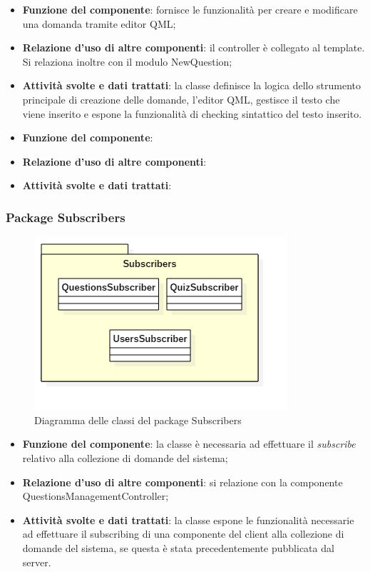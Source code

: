 \begin{itemize}
	\item\textbf{Funzione del componente}: fornisce le funzionalità per creare e modificare una domanda tramite editor QML;
	\item\textbf{Relazione d'uso di altre componenti}: il controller è collegato al template. Si relaziona inoltre con il modulo NewQuestion;
	\item\textbf{Attività svolte e dati trattati}: la classe definisce la logica dello strumento principale di creazione delle domande, l'editor QML, gestisce il testo che viene inserito e espone la funzionalità di checking sintattico del testo inserito.
\end{itemize}


\begin{itemize}
	\item\textbf{Funzione del componente}: 
	\item\textbf{Relazione d'uso di altre componenti}: 
	\item\textbf{Attività svolte e dati trattati}:
\end{itemize}

			\subsubsection{Package Subscribers}
\begin{figure}[h!]
\begin{center}
	\includegraphics[scale=0.65]{../images/SubscribersClass.png}
	\caption{Diagramma delle classi del package Subscribers}
\end{center}
\end{figure}


\begin{itemize}
	\item\textbf{Funzione del componente}: la classe è necessaria ad effettuare il \emph{subscribe} relativo alla collezione di domande del sistema;
	\item\textbf{Relazione d'uso di altre componenti}: si relazione con la componente QuestionsManagementController;
	\item\textbf{Attività svolte e dati trattati}: la classe espone le funzionalità necessarie ad effettuare il subscribing di una componente del client alla collezione di domande del sistema, se questa è stata precedentemente pubblicata dal server.
\end{itemize}

